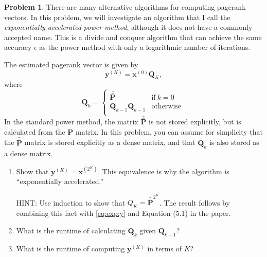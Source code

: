 \documentclass[10pt]{article}
\theoremstyle{definition}
\newtheorem{problem}{Problem}
\newcommand{\Q}{\mathbf Q}
\newcommand{\p}{\mathbf P}
\newcommand{\pb}{\bar {\p}}
\newcommand{\pbb}{\bar {\pb}}
\newcommand{\x}{\mathbf x}
\newcommand{\y}{\mathbf y}
\begin{document}
\newpage
\begin{problem}
    There are many alternative algorithms for computing pagerank vectors.
    In this problem, we will investigate an algorithm that I call the \emph{exponentially accelerated power method},
    although it does not have a commonly accepted name.
    This is a divide and conquer algorithm that can achieve the same accuracy $\epsilon$ as the power method with only a logarithmic number of iterations.

    The estimated pagerank vector is given by
    \begin{equation}
        \label{eq:exp:y}
        \y^{(K)} = \x^{(0)} \Q_K
        ,
    \end{equation}
    where
    \begin{equation}
        \Q_k = 
        \begin{cases}
            \pbb & \text{if}~k=0 \\
            \Q_{k-1} \Q_{k-1} & \text{otherwise} \\
        \end{cases}
        .
    \end{equation}
    In the standard power method, the matrix $\pbb$ is not stored explicitly,
    but is calculated from the $\p$ matrix.
    In this problem, you can assume for simplicity that the $\pbb$ matrix is stored explicitly as a dense matrix,
    and that $\Q_k$ is also stored as a dense matrix.

    \begin{enumerate}
        \item
            Show that $\y^{(K)} = \x^{(2^K)}$.
            This equivalence is why the algorithm is ``exponentially accelerated.''

            HINT: 
            Use induction to show that $Q_{K} = \pbb^{2^{K}}$.
            The result follows by combining this fact with \eqref{eq:exp:y} and Equation (5.1) in the paper.
            \vspace{3in}

        \item
            What is the runtime of calculating $\Q_k$ given $\Q_{k-1}$? 
            \vspace{4in}

        \item 
            What is the runtime of computing $\y^{(K)}$ in terms of $K$?
            \vspace{3in}


\end{enumerate}
\end{problem}
\end{document}
